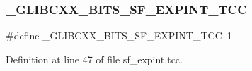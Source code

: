 \subsubsection{\texorpdfstring{\+\_\+\+G\+L\+I\+B\+C\+X\+X\+\_\+\+B\+I\+T\+S\+\_\+\+S\+F\+\_\+\+E\+X\+P\+I\+N\+T\+\_\+\+T\+CC}{\_GLIBCXX\_BITS\_SF\_EXPINT\_TCC}}
{\footnotesize\ttfamily \#define \+\_\+\+G\+L\+I\+B\+C\+X\+X\+\_\+\+B\+I\+T\+S\+\_\+\+S\+F\+\_\+\+E\+X\+P\+I\+N\+T\+\_\+\+T\+CC~1}



Definition at line 47 of file sf\+\_\+expint.\+tcc.

